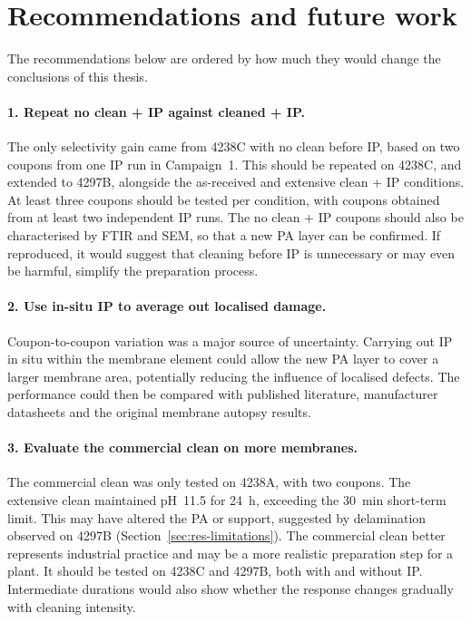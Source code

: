 \section{Recommendations and future work}
\label{sec:future-work}
The recommendations below are ordered by how much they would change the conclusions of this thesis.

\paragraph{1. Repeat no clean + IP against cleaned + IP.}
The only selectivity gain came from 4238C with no clean before IP, based on two coupons from one IP run in Campaign~1. This should be repeated on 4238C, and extended to 4297B, alongside the as-received and extensive clean + IP conditions. At least three coupons should be tested per condition, with coupons obtained from at least two independent IP runs. The no clean + IP coupons should also be characterised by FTIR and SEM, so that a new PA layer can be confirmed. If reproduced, it would suggest that cleaning before IP is unnecessary or may even be harmful, simplify the preparation process.

\paragraph{2. Use in-situ IP to average out localised damage.}
Coupon-to-coupon variation was a major source of uncertainty. Carrying out IP in situ within the membrane element could allow the new PA layer to cover a larger membrane area, potentially reducing the influence of localised defects. The performance could then be compared with published literature, manufacturer datasheets and the original membrane autopsy results.

\paragraph{3. Evaluate the commercial clean on more membranes.}
The commercial clean was only tested on 4238A, with two coupons. The extensive clean maintained pH~11.5 for \qty{24}{\hour}, exceeding the \qty{30}{\minute} short-term limit. This may have altered the PA or support, suggested by delamination observed on 4297B (Section~\ref{sec:res-limitations}). The commercial clean better represents industrial practice and may be a more realistic preparation step for a plant. It should be tested on 4238C and 4297B, both with and without IP. Intermediate durations would also show whether the response changes gradually with cleaning intensity.

